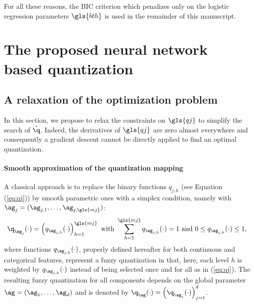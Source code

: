 For all these reasons, the BIC criterion which penalizes only on the logistic regression parameters $\gls{bth}$ is used in the remainder of this manuscript.

\section{The proposed neural network based quantization}
\label{sec:proposal}

\subsection{A relaxation of the optimization problem} \label{subsec:relaxation}

In this section, we propose to relax the constraints on $\gls{qj}$ to simplify the search of $\hat{\q}$. Indeed, the derivatives of $\gls{qj}$ are zero almost everywhere and consequently a gradient descent cannot be directly applied to find an optimal quantization.

\paragraph{Smooth approximation of the quantization mapping}

A classical approach is to replace the binary functions $q_{j,h}$ (see Equation (\ref{eq:qj}))  by smooth parametric ones  with a simplex condition, namely with $\ag_j=(\ag_{j,1},\ldots, \ag_{j,\gls{mj}})$:
\begin{equation*}
    {\q_{\ag_j}(\cdot)=\left(q_{\ag_{j,h}}(\cdot)\right)_{h=1}^{\gls{mj}} \text{ with } \sum_{h=1}^{\gls{mj}}q_{\ag_{j,h}}(\cdot)=1 \text{ and } 0 \leq q_{\ag_{j,h}}(\cdot) \leq 1,}
\end{equation*}
where functions $q_{\ag_{j,h}}(\cdot)$, properly defined hereafter for both continuous and categorical features, represent a fuzzy quantization in that, here, each level $h$ is weighted by $q_{\ag_{j,h}}(\cdot)$ instead of being selected once and for all as in (\ref{eq:qj}). The resulting fuzzy quantization for all components depends on the global parameter $\ag = (\ag_1, \ldots, \ag_d)$ and is denoted by $\q_{\ag}(\cdot)=\left(\q_{\ag_j}(\cdot)\right)_{j=1}^d$. 




